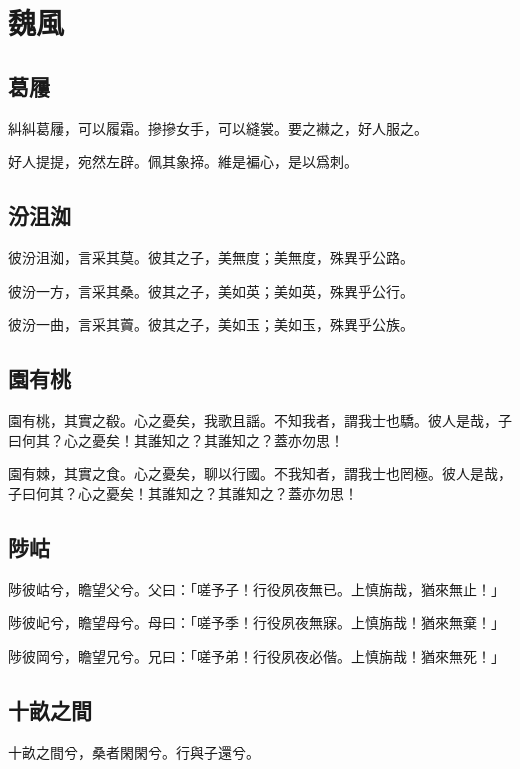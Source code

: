 \section[魏風]{魏風}

\subsection[葛屨]{葛屨}

糾糾葛屨，可以履霜。摻摻女手，可以縫裳。要之襋之，好人服之。

好人提提，宛然左辟。佩其象揥。維是褊心，是以爲刺。

\subsection[汾沮洳]{汾沮洳}

彼汾沮洳，言采其莫。彼其之子，美無度；美無度，殊異乎公路。

彼汾一方，言采其桑。彼其之子，美如英；美如英，殊異乎公行。

彼汾一曲，言采其藚。彼其之子，美如玉；美如玉，殊異乎公族。

\subsection[園有桃]{園有桃}

園有桃，其實之殽。心之憂矣，我歌且謡。不知我者，謂我士也驕。彼人是哉，子曰何其？心之憂矣！其誰知之？其誰知之？蓋亦勿思！

園有棘，其實之食。心之憂矣，聊以行國。不我知者，謂我士也罔極。彼人是哉，子曰何其？心之憂矣！其誰知之？其誰知之？蓋亦勿思！

\subsection[陟岵]{陟岵}

陟彼岵兮，瞻望父兮。父曰：「嗟予子！行役夙夜無已。上慎旃哉，猶來無止！」

陟彼屺兮，瞻望母兮。母曰：「嗟予季！行役夙夜無寐。上慎旃哉！猶來無棄！」

陟彼岡兮，瞻望兄兮。兄曰：「嗟予弟！行役夙夜必偕。上慎旃哉！猶來無死！」

\subsection[十畝之間]{十畝之間}

十畝之間兮，桑者閑閑兮。行與子還兮。

